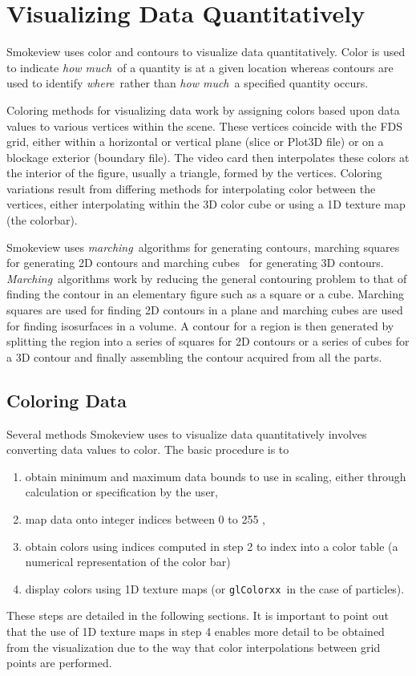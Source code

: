 \documentclass[11pt,twoside]{book}
\begin{document}
%
%

\chapter{Visualizing Data Quantitatively}
Smokeview uses color and contours to visualize data quantitatively.  Color is used
to indicate {\em how much}\ of a quantity is at a given location whereas
contours are used to identify {\em where}\ rather than {\em how much}\ a specified quantity occurs.

Coloring methods for visualizing data work by assigning colors based upon data values to various vertices within the scene.
These vertices coincide with the FDS grid, either within a horizontal or vertical plane (slice or Plot3D file) or on a blockage exterior (boundary file).  The video card then interpolates these colors at the interior of the figure, usually a triangle, formed by the vertices.
Coloring variations result from differing methods for interpolating color between the vertices, either interpolating within the 3D color cube or using a 1D texture map (the colorbar).

Smokeview uses {\em marching}\ algorithms for generating contours, marching squares for generating 2D contours and marching cubes~\cite{marchingcubes} for generating 3D contours.
{\em Marching}\ algorithms work by reducing the general contouring problem to that of finding the contour in an elementary figure such as a square or a cube.  Marching
squares are used for finding 2D contours in a plane and marching cubes are used for finding isosurfaces in a volume.
A contour for a region is then generated by splitting the region into a series of squares for 2D contours or a series of cubes for a 3D contour and finally assembling the contour acquired from all the parts.

\section{Coloring Data}
Several methods Smokeview uses to visualize data quantitatively involves converting data values to color.
The basic procedure is to
\begin{enumerate}
\item obtain minimum and maximum data bounds to use in scaling, either through calculation or specification by the user,
\item map data onto integer indices between 0 to 255 ,
\item obtain colors using indices computed in step 2 to index into a color table (a numerical representation of the color bar)
\item display colors using 1D texture maps (or {\tt glColorxx}\ in the case of particles).
\end{enumerate}
These steps are detailed in the following sections.   It is important to point out that the use of 1D texture maps in step 4 enables more detail to be obtained from the visualization due to the way that color interpolations between grid points are performed.
\end{document}
